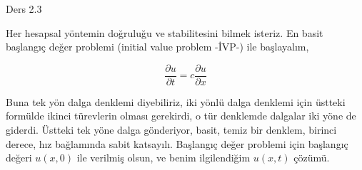 \documentclass[12pt,fleqn]{article}\usepackage{../../common}
\begin{document}
Ders 2.3

Her hesapsal yöntemin doğruluğu ve stabilitesini bilmek isteriz. En basit
başlangıç değer problemi (initial value problem -İVP-) ile başlayalım,

$$
\frac{\partial u}{\partial t} =
c \frac{\partial u}{\partial x}
$$

Buna tek yön dalga denklemi diyebiliriz, iki yönlü dalga denklemi için üstteki
formülde ikinci türevlerin olması gerekirdi, o tür denklemde dalgalar iki yöne
de giderdi. Üstteki tek yöne dalga gönderiyor, basit, temiz bir denklem, birinci
derece, hız bağlamında sabit katsayılı. Başlangıç değer problemi için başlangıç
değeri $u(x,0)$ ile verilmiş olsun, ve benim ilgilendiğim $u(x,t)$ çözümü.
\end{document}
